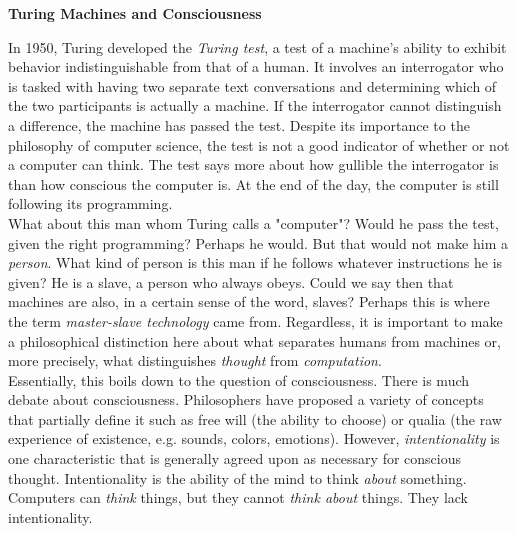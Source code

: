 \begin{tcolorbox}[breakable, enhanced, colback=textbook-blue, sharp corners]
	\vspace{2mm}
	\begin{center}
		\textbf{Turing Machines and Consciousness}
	\end{center}
	\vspace{1mm}
	In 1950, Turing developed the \textit{Turing test}, a test of a machine's ability to exhibit behavior indistinguishable from that of a human. It involves an interrogator who is tasked with having two separate text conversations and determining which of the two participants is actually a machine. If the interrogator cannot distinguish a difference, the machine has passed the test. Despite its importance to the philosophy of computer science, the test is not a good indicator of whether or not a computer can think. The test says more about how gullible the interrogator is than how conscious the computer is. At the end of the day, the computer is still following its programming. \\
	
	What about this man whom Turing calls a "computer"? Would he pass the test, given the right programming? Perhaps he would. But that would not make him a \textit{person}. What kind of person is this man if he follows whatever instructions he is given? He is a slave, a person who always obeys. Could we say then that machines are also, in a certain sense of the word, slaves? Perhaps this is where the term \textit{master-slave technology} came from. Regardless, it is important to make a philosophical distinction here about what separates humans from machines or, more precisely, what distinguishes \textit{thought} from \textit{computation}. \\
	
	Essentially, this boils down to the question of consciousness. There is much debate about consciousness. Philosophers have proposed a variety of concepts that partially define it such as free will (the ability to choose) or qualia (the raw experience of existence, e.g. sounds, colors, emotions). However, \textit{intentionality} is one characteristic that is generally agreed upon as necessary for conscious thought. Intentionality is the ability of the mind to think \textit{about} something. Computers can \textit{think} things, but they cannot \textit{think about} things. They lack intentionality.\\
	

\end{tcolorbox}
